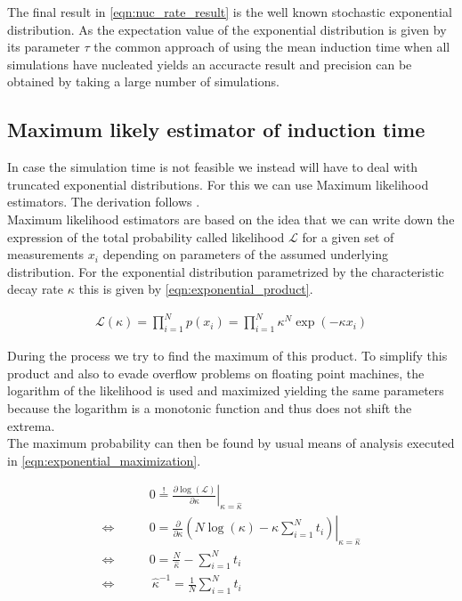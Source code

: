 The final result in \autoref{eqn:nuc_rate_result} is the well known stochastic exponential distribution. As the expectation value of the exponential distribution is given by its parameter $\tau$ the common approach of using the mean induction time when all simulations have nucleated yields an accuracte result and precision can be obtained by taking a large number of simulations.\\


\subsection{Maximum likely estimator of induction time}
\label{sec:ml_estimator}
In case the simulation time is not feasible we instead will have to deal with truncated exponential distributions. For this we can use Maximum likelihood estimators. The derivation follows .\\

Maximum likelihood estimators are based on the idea that we can write down the expression of the total probability called likelihood $\mathcal{L}$ for a given set of measurements $x_i$ depending on parameters of the assumed underlying distribution. For the exponential distribution parametrized by the characteristic decay rate $\kappa$ this is given by \autoref{eqn:exponential_product}.

\begin{align}
\label{eqn:exponential_product}
\mathcal{L}(\kappa) = \prod_{i=1}^N p(x_i) = \prod_{i=1}^N \kappa^N \exp\left( - \kappa x_i \right ) 
\end{align}

During the process we try to find the maximum of this product. To simplify this product and also to evade overflow problems on floating point machines, the logarithm of the likelihood is used and maximized yielding the same parameters because the logarithm is a monotonic function and thus does not shift the extrema.\\
The maximum probability can then be found by usual means of analysis executed in \autoref{eqn:exponential_maximization}.

\begin{align}
\label{eqn:exponential_maximization}
& 0 \stackrel{!}{=} \left. \frac{\partial \log(\mathcal{L})}{\partial \kappa} \right|_{\kappa=\hat{\kappa}}\\
\Leftrightarrow \qquad  &0 = \left. \frac{\partial}{\partial \kappa} \left( N \log(\kappa) - \kappa \sum_{i=1}^N t_i \right)  \right|_{\kappa=\hat{\kappa}} \\
\Leftrightarrow \qquad &0 = \frac{N}{\hat{\kappa}} - \sum_{i=1}^N t_i \\
\Leftrightarrow  \qquad & \!\!\!\!\!\!\!\!\: \hat{\kappa}^{-1} = \frac{1}{N} \sum_{i=1}^N t_i  
\end{align}

